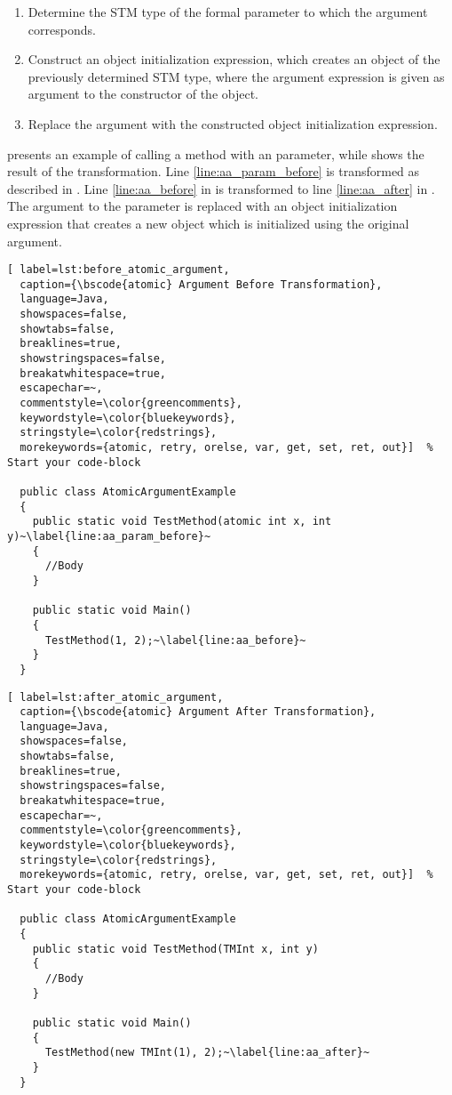 \begin{enumerate}
	\item Determine the \ac{STM} type of the formal parameter to which the argument corresponds.
	\item Construct an object initialization expression, which creates an object of the previously determined \ac{STM} type, where the argument expression is given as argument to the constructor of the object.
	\item Replace the argument with the constructed object initialization expression.
\end{enumerate}

 presents an example of calling a method with an  parameter, while  shows the result of the transformation. Line \ref{line:aa_param_before} is transformed as described in . Line \ref{line:aa_before} in  is transformed to line \ref{line:aa_after} in . The argument to the  parameter is replaced with an object initialization expression that creates a new  object which is initialized using the original argument.

\begin{lstlisting}[ label=lst:before_atomic_argument,
  caption={\bscode{atomic} Argument Before Transformation},
  language=Java,  
  showspaces=false,
  showtabs=false,
  breaklines=true,
  showstringspaces=false,
  breakatwhitespace=true,
  escapechar=~,
  commentstyle=\color{greencomments},
  keywordstyle=\color{bluekeywords},
  stringstyle=\color{redstrings},
  morekeywords={atomic, retry, orelse, var, get, set, ret, out}]  % Start your code-block

  public class AtomicArgumentExample
  {
    public static void TestMethod(atomic int x, int y)~\label{line:aa_param_before}~
    {
      //Body
    }

    public static void Main()
    {
      TestMethod(1, 2);~\label{line:aa_before}~
    }
  }
\end{lstlisting}

\begin{lstlisting}[ label=lst:after_atomic_argument,
  caption={\bscode{atomic} Argument After Transformation},
  language=Java,  
  showspaces=false,
  showtabs=false,
  breaklines=true,
  showstringspaces=false,
  breakatwhitespace=true,
  escapechar=~,
  commentstyle=\color{greencomments},
  keywordstyle=\color{bluekeywords},
  stringstyle=\color{redstrings},
  morekeywords={atomic, retry, orelse, var, get, set, ret, out}]  % Start your code-block

  public class AtomicArgumentExample
  {
    public static void TestMethod(TMInt x, int y)
    {
      //Body
    }

    public static void Main()
    {
      TestMethod(new TMInt(1), 2);~\label{line:aa_after}~
    }
  }
\end{lstlisting}

